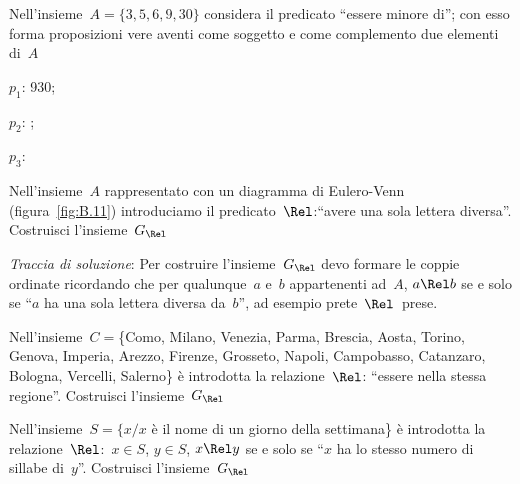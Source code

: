 \begin{esercizio}
\label{ese:B.2}
Nell'insieme~$A = \{ 3,5,6,9,30 \}$ considera il predicato ``essere minore 
di''; 
con esso forma proposizioni vere aventi come soggetto e come complemento due 
elementi di~$A$
\begin{multicols}{3}
\begin{enumeratea}
\item $p_1$: 930;
\item $p_2$: \dotfill;
\item $p_3$: \dotfill
\end{enumeratea}
\end{multicols}
\end{esercizio}

\begin{multicols}{2}

\begin{esercizio}
\label{ese:B.3}
Nell'insieme~$A$ rappresentato con un diagramma di Eulero-Venn 
(figura~\ref{fig:B.11}) introduciamo il predicato~$\Rel$:``avere
una sola lettera diversa''. Costruisci l'insieme~$G_\Rel$

\emph{Traccia di soluzione}:
Per costruire l'insieme~$G_\Rel$ devo formare le coppie ordinate ricordando 
che per qualunque~$a$ e~$b$ appartenenti ad~$A$, $a \Rel b$
se e solo se ``$a$ ha una sola lettera diversa da~$b$'', ad esempio 
prete~$ \Rel$~prese.

\begin{center}
\begin{inaccessibleblock}
 
\end{inaccessibleblock}
\end{center}

\end{esercizio}

\end{multicols}

\begin{esercizio}
\label{ese:B.4}
Nell'insieme~$C = $\{Como, Milano, Venezia, Parma, Brescia, Aosta, Torino, 
Genova, Imperia, Arezzo, Firenze, Grosseto, Napoli, Campobasso, Catanzaro, 
Bologna, Vercelli, Salerno\} è introdotta la relazione~$\Rel$: 
``essere nella stessa regione''. Costruisci l'insieme~$G_\Rel$
\end{esercizio}

\begin{esercizio}
\label{ese:B.5}
Nell'insieme~$S = \{ x / x$ è il nome di un giorno della settimana\} è 
introdotta la relazione~$\Rel$:~$x \in S$, $y \in S$, $x \Rel y$ se e solo 
se ``$x$ ha lo stesso numero di sillabe di~$y$''. Costruisci l'insieme~$G_\Rel$
\end{esercizio}

